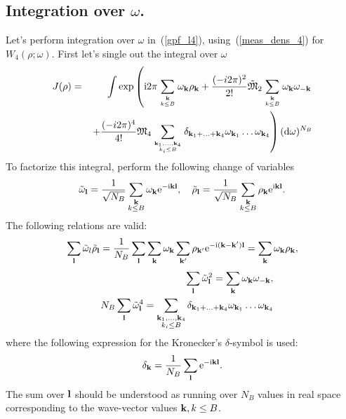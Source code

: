 \subsection{Integration over $\omega$.}
Let's perform integration over $\omega$ in~(\ref{gpf_l4}), using~(\ref{meas_dens_4}) for $W_4(\rho; \omega)$. First let's single out the integral over $\omega$
\begin{eqnarray}
	J(\rho) &=& \int \exp \left(
	{\rm i}2\pi \sum\limits_{{\vb k} \atop k\le B} \omega_{\vb k} \rho_{\vb k}
	+ \frac{(-i2\pi)^2}{2!}\tilde{\frak M}_2 \sum\limits_{{\vb k} \atop k\le B} \omega_{\vb k} \omega_{-\vb k}
	\right.
	\nonumber\\
	&& \left. +
	\frac{(-i2\pi)^4}{4!} 
	{\frak M}_4
	\sum\limits_{\vb{k}_1,\dotsc,\vb{k}_4\atop{k_i \le B}}
	\delta_{\vb{k}_1 + \dotsc + \vb{k}_4} 
	\omega_{{\vb k}_1} \dots \omega_{{\vb k}_4} \right) ({\rm d} \omega)^{N_B}
\end{eqnarray}
To factorize this integral, perform the following change of variables
\begin{equation}
	\tilde{\omega}_{\vb l} = \frac{1}{\sqrt{N_B}}\sum_{\substack{\vb k \\ k \leq B}} \omega_{\vb k} {\rm e}^{-{\rm i}\vb k \vb l}
	, \quad \tilde{\rho}_{\vb l} = \frac{1}{\sqrt{N_B}} \sum_{\substack{\vb k \\ k \leq B}} \rho_{\vb k} {\rm e}^{{\rm i}\vb k \vb l}.
\end{equation}
The following relations are valid:
\begin{equation}
	\sum_{\vb l} \tilde{\omega}_{l} \tilde{\rho}_{\vb l} = \frac{1}{N_B} \sum_{\vb l} \sum_{\vb k} \omega_{\vb k} \sum_{\vb k'} \rho_{\vb k'} {\rm e}^{-{\rm i} (\vb k - \vb k') \vb l} = \sum_{\vb k} \omega_{\vb k} \rho_{\vb k},
\end{equation}
\begin{eqnarray}
	&&\sum_{\vb l}\tilde{\omega}_{\vb l}^2 = \sum_{\vb k}\omega_{\vb k} \omega_{-\vb k},
	\\
	&&N_B \sum_{\vb l}\tilde{\omega}_{\vb l}^4 = \sum\limits_{\substack{\vb{k}_1,\dotsc,\vb{k}_4 \\ {k_i \le B}}}
	\delta_{\vb{k}_1 + \dotsc + \vb{k}_4} 
	\omega_{{\vb k}_1} \dots \omega_{{\vb k}_4}
\end{eqnarray}
where the following expression for the Kronecker's $\delta$-symbol is used:
\begin{equation}
	\delta_{\vb k} = \frac{1}{N_B}\sum_{\vb l} {\rm e}^{-{\rm i} \vb k \vb l}.
\end{equation}
The sum over $\vb l$ should be understood as running over $N_B$ values in real space corresponding to the wave-vector values $\vb k, k\leq B$.

